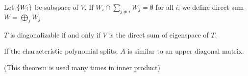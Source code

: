 \begin{definition}
    Let $\set{W_i}$ be subspace of $V$. If $W_i \cap \sum_{j \neq i} W_j = \emptyset$ for all $i$, we define direct sum $W = \bigoplus_{j} W_j$
\end{definition}

\begin{theorem}
    $T$ is diagonalizable if and only if $V$ is the direct sum of eigenspace of $T$.    
\end{theorem}



\begin{theorem}\label{split_means_upper_trangular}
    If the characteristic polynomial splits, $A$ is similar to an upper diagonal matrix.
    
    (This theorem is used many times in inner product)
\end{theorem}
